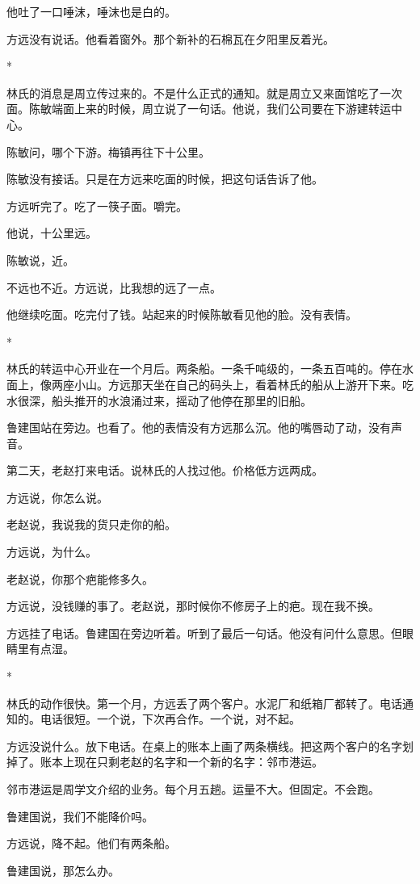 \documentclass[UTF8,a5paper,11pt,openany]{ctexbook}
\newcommand{\scene}{\vspace{1em}\begin{center}*\quad*\quad*\end{center}\vspace{0.5em}}
\begin{document}
他吐了一口唾沫，唾沫也是白的。

方远没有说话。他看着窗外。那个新补的石棉瓦在夕阳里反着光。


\scene

林氏的消息是周立传过来的。不是什么正式的通知。就是周立又来面馆吃了一次面。陈敏端面上来的时候，周立说了一句话。他说，我们公司要在下游建转运中心。

陈敏问，哪个下游。梅镇再往下十公里。

陈敏没有接话。只是在方远来吃面的时候，把这句话告诉了他。

方远听完了。吃了一筷子面。嚼完。

他说，十公里远。

陈敏说，近。

不远也不近。方远说，比我想的远了一点。

他继续吃面。吃完付了钱。站起来的时候陈敏看见他的脸。没有表情。


\scene

林氏的转运中心开业在一个月后。两条船。一条千吨级的，一条五百吨的。停在水面上，像两座小山。方远那天坐在自己的码头上，看着林氏的船从上游开下来。吃水很深，船头推开的水浪涌过来，摇动了他停在那里的旧船。

鲁建国站在旁边。也看了。他的表情没有方远那么沉。他的嘴唇动了动，没有声音。

第二天，老赵打来电话。说林氏的人找过他。价格低方远两成。

方远说，你怎么说。

老赵说，我说我的货只走你的船。

方远说，为什么。

老赵说，你那个疤能修多久。

方远说，没钱赚的事了。老赵说，那时候你不修房子上的疤。现在我不换。

方远挂了电话。鲁建国在旁边听着。听到了最后一句话。他没有问什么意思。但眼睛里有点湿。


\scene

林氏的动作很快。第一个月，方远丢了两个客户。水泥厂和纸箱厂都转了。电话通知的。电话很短。一个说，下次再合作。一个说，对不起。

方远没说什么。放下电话。在桌上的账本上画了两条横线。把这两个客户的名字划掉了。账本上现在只剩老赵的名字和一个新的名字：邻市港运。

邻市港运是周学文介绍的业务。每个月五趟。运量不大。但固定。不会跑。

鲁建国说，我们不能降价吗。

方远说，降不起。他们有两条船。

鲁建国说，那怎么办。
\end{document}
